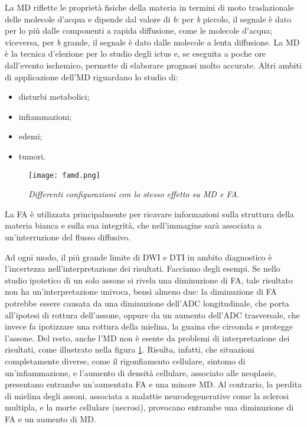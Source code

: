 \documentclass{report}
\newcommand{\figref}[1]{figura \ref{#1}}
\numberwithin{equation}{section}
\numberwithin{figure}{section}
\begin{document}
La MD riflette le proprietà fisiche della materia in termini di moto traslazionale delle molecole d'acqua e dipende dal valore di \textit{b}: per \textit{b} piccolo, il segnale è dato per lo più dalle componenti a rapida diffusione, come le molecole d'acqua; viceversa, per \textit{b} grande, il segnale è dato dalle molecole a lenta diffusione. La MD è la tecnica d'elezione per lo studio degli ictus e, se eseguita a poche ore dall'evento ischemico, permette di elaborare prognosi molto accurate. Altri ambiti di applicazione dell'MD riguardano lo studio di:
\begin{itemize}[label=$-$]
    \item disturbi metabolici;
    \item infiammazioni;
    \item edemi;
    \item tumori.
\end{itemize}

\begin{figure}[H]
\centering
\texttt{[image: famd.png]}
\caption{\label{fig:famd} \textit{Differenti configurazioni con lo stesso effetto su MD e FA}.}
\end{figure}

La FA è utilizzata principalmente per ricavare informazioni sulla struttura della materia bianca e sulla sua integrità, che nell'immagine sarà associata a un'interruzione del flusso diffusivo.

Ad ogni modo, il più grande limite di DWI e DTI in ambito diagnostico è l'incertezza nell'interpretazione dei risultati. Facciamo degli esempi. Se nello studio ipotetico di un solo assone si rivela una diminuzione di FA, tale risultato non ha un'interpretazione univoca, bensì almeno due: la diminuzione di FA potrebbe essere causata da una diminuzione dell'ADC longitudinale, che porta all'ipotesi di rottura dell'assone, oppure da un aumento dell'ADC trasversale, che invece fa ipotizzare una rottura della mielina, la guaina che circonda e protegge l'assone. Del resto, anche l'MD non è esente da problemi di interpretazione dei risultati, come illustrato nella \figref{fig:famd}. Risulta, infatti, che situazioni completamente diverse, come il rigonfiamento cellulare, sintomo di un'infiammazione, e l'aumento di densità cellulare, associato alle neoplasie, presentano entrambe un'aumentata FA e una minore MD. Al contrario, la perdita di mielina degli assoni, associata a malattie neurodegenerative come la sclerosi multipla, e la morte cellulare (necrosi), provocano entrambe una diminuzione di FA e un aumento di MD.
\end{document}
